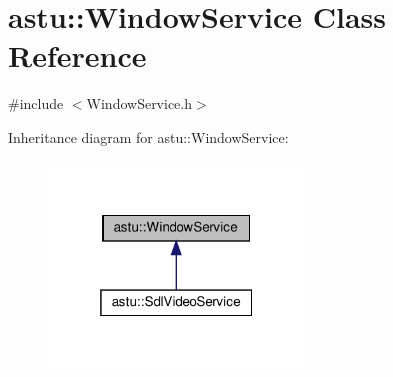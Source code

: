 \hypertarget{classastu_1_1WindowService}{}\section{astu\+:\+:Window\+Service Class Reference}
\label{classastu_1_1WindowService}


{\ttfamily \#include $<$Window\+Service.\+h$>$}



Inheritance diagram for astu\+:\+:Window\+Service\+:\nopagebreak
\begin{figure}[H]
\begin{center}
\leavevmode
\includegraphics[width=193pt]{classastu_1_1WindowService__inherit__graph}
\end{center}
\end{figure}
